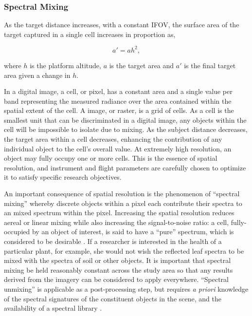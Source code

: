 \subsubsection*{Spectral Mixing}

As the target distance increases, with a constant IFOV, the surface area of the target captured in a single cell increases in proportion as, 

\begin{equation}
a\prime = a h^2,
\end{equation}

where $h$ is the platform altitude, $a$ is the target area and $a\prime$ is the final target area given a change in $h$. 

In a digital image, a cell, or pixel, has a constant area and a single value per band representing the measured radiance over the area contained within the spatial extent of the cell. A image, or raster, is a grid of cells. As a cell is the smallest unit that can be discriminated in a digital image, any objects within the cell will be impossible to isolate due to mixing. As the subject distance decreases, the target area within a cell decreases, enhancing the contribution of any individual object to the cell's overall value. At extremely high resolution, an object may fully occupy one or more cells. This is the essence of spatial resolution, and instrument and flight parameters are carefully chosen to optimize it to satisfy specific research objectives. 

An important consequence of spatial resolution is the phenomenon of ``spectral mixing'' whereby discrete objects within a pixel each contribute their spectra to an mixed spectrum within the pixel. Increasing the spatial resolution reduces aereal or linear mixing \cite{Gupta2018} while also increasing the signal-to-noise ratio: a cell, fully-occupied by an object of interest, is said to have a ``pure'' spectrum, which is considered to be desirable \cite{Gupta2018}. If a researcher is interested in the health of a particular plant, for example, she would not wish the reflected leaf spectra to be mixed with the spectra of soil or other objects. It is important that spectral mixing be held reasonably constant across the study area so that any results derived from the imagery can be considered to apply everywhere. ``Spectral unmixing'' is applicable as a post-processing step, but requires \emph{a priori} knowledge of the spectral signatures of the constituent objects in the scene, and the availability of a spectral library \cite{Adams1986,Smith1990,Gupta2018}.






